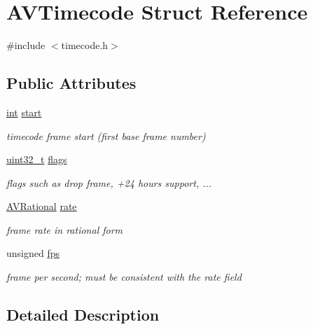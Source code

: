 \hypertarget{struct_a_v_timecode}{}\section{A\+V\+Timecode Struct Reference}
\label{struct_a_v_timecode}


{\ttfamily \#include $<$timecode.\+h$>$}

\subsection*{Public Attributes}
\begin{DoxyCompactItemize}
\item 
\hyperlink{xmltok_8h_a5a0d4a5641ce434f1d23533f2b2e6653}{int} \hyperlink{struct_a_v_timecode_af467d05fd293b6206e635e453b1f524a}{start}
\begin{DoxyCompactList}\small\item\em timecode frame start (first base frame number) \end{DoxyCompactList}\item 
\hyperlink{lib-src_2ffmpeg_2win32_2stdint_8h_a6eb1e68cc391dd753bc8ce896dbb8315}{uint32\+\_\+t} \hyperlink{struct_a_v_timecode_a76c634043ddfaa9b5772af8286e76216}{flags}
\begin{DoxyCompactList}\small\item\em flags such as drop frame, +24 hours support, ... \end{DoxyCompactList}\item 
\hyperlink{struct_a_v_rational}{A\+V\+Rational} \hyperlink{struct_a_v_timecode_a96510357827972576efb578725affb89}{rate}
\begin{DoxyCompactList}\small\item\em frame rate in rational form \end{DoxyCompactList}\item 
unsigned \hyperlink{struct_a_v_timecode_a4f51e07f80e11263ccfb5efafdab5024}{fps}
\begin{DoxyCompactList}\small\item\em frame per second; must be consistent with the rate field \end{DoxyCompactList}\end{DoxyCompactItemize}


\subsection{Detailed Description}


